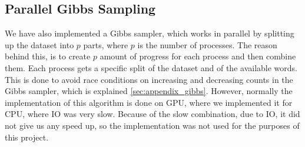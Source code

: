\subsection{Parallel Gibbs Sampling}\label{sec:appendix_para_gibbs}
We have also implemented a Gibbs sampler, which works in parallel by splitting up the dataset into $p$ parts, where $p$ is the number of processes.
The reason behind this, is to create $p$ amount of progress for each process and then combine them.
Each process gets a specific split of the dataset and of the available words. 
This is done to avoid race conditions on increasing and decreasing counts in the Gibbs sampler, which is explained \autoref{sec:appendix_gibbs}.
However, normally the implementation of this algorithm is done on GPU, where we implemented it for CPU, where IO was very slow.
Because of the slow combination, due to IO, it did not give us any speed up, so the implementation was not used for the purposes of this project. 